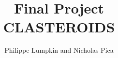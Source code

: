 \documentclass[10pt,conference,onecolumn,compsoc]{IEEEtran}
\begin{document}
%
\title{Final Project\\ CLASTEROIDS}
%
%
%
%

\author{ Philippe Lumpkin and Nicholas Pica\\%
}

% 
%
\end{document}
